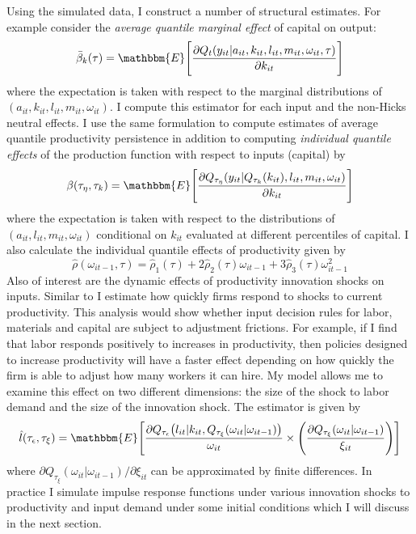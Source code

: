\documentclass{article}
\begin{document}
Using the simulated data, I construct a number of structural estimates. For example consider the \textit{average quantile marginal effect} of capital on output:
\begin{equation*}
\bar{\beta}_{k}(\tau)=\mathbbm{E}\Bigg[\frac{\partial Q_{t}(y_{it}|a_{it}, k_{it}, l_{it}, m_{it}, \omega_{it},\tau)}{\partial k_{it}}\Bigg]
\end{equation*}
where the expectation is taken with respect to the marginal distributions of $(a_{it}, k_{it}, l_{it}, m_{it}, \omega_{it})$. I compute this estimator for each input and the non-Hicks neutral effects. I use the same formulation to compute estimates of average quantile productivity persistence in addition to computing \textit{individual quantile effects} of the production function with respect to inputs (capital) by
\begin{equation*}
\beta(\tau_{\eta}, \tau_{k})=\mathbbm{E}\Bigg[\frac{\partial Q_{\tau_{\eta}}(y_{it}|Q_{\tau_{k}}(k_{it}), l_{it}, m_{it}, \omega_{it})}{\partial k_{it}}\Bigg]
\end{equation*}
where the expectation is taken with respect to the distributions of $(a_{it}, l_{it}, m_{it}, \omega_{it})$ conditional on $k_{it}$ evaluated at different percentiles of capital. I also calculate the individual quantile effects of productivity given by
\begin{equation*}
\hat{\rho}(\omega_{it-1},\tau)=\hat{\rho}_{1}(\tau)+2\hat{\rho}_{2}(\tau)\omega_{it-1}+3\hat{\rho}_{3}(\tau)\omega^{2}_{it-1}
\end{equation*}
Also of interest are the dynamic effects of productivity innovation shocks on inputs. Similar to \cite{Hu2019} I estimate how quickly firms respond to shocks to current productivity. This analysis would show whether input decision rules for labor, materials and capital are subject to adjustment frictions. For example, if I find that labor responds positively to increases in productivity, then policies designed to increase productivity will have a faster effect depending on how quickly the firm is able to adjust how many workers it can hire. My model allows me to examine this effect on two different dimensions: the size of the shock to labor demand and the size of the innovation shock. The estimator is given by 
\begin{equation*}
\hat{l}(\tau_{\epsilon}, \tau_{\xi})=\mathbbm{E}\Bigg[\frac{\partial Q_{\tau_{\epsilon}}\big(l_{it}|k_{it},Q_{\tau_{\xi}}(\omega_{it}|\omega_{it-1})\big)}{\omega_{it}}\times\Bigg(\frac{\partial Q_{\tau_{\xi}}(\omega_{it}|\omega_{it-1})}{\xi_{it}}\Bigg)\Bigg]
\end{equation*}
where $\partial Q_{\tau_{\xi}}(\omega_{it}|\omega_{it-1})/\partial \xi_{it}$ can be approximated by finite differences. In practice I simulate impulse response functions under various innovation shocks to productivity and input demand under some initial conditions which I will discuss in the next section.
\end{document}
